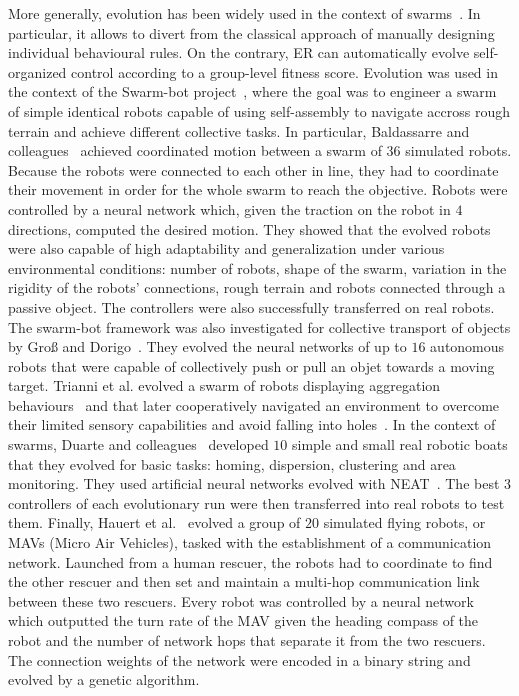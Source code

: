     More generally, evolution has been widely used in the context of swarms~\parencite{Brambilla2012, Francesca2016}. In particular, it allows to divert from the classical approach of manually designing individual behavioural rules. On the contrary, ER can automatically evolve self-organized control according to a group-level fitness score. Evolution was used in the context of the Swarm-bot project~\parencite{Mondada2005}, where the goal was to engineer a swarm of simple identical robots capable of using self-assembly to navigate accross rough terrain and achieve different collective tasks. In particular, Baldassarre and colleagues~\parencite{Baldassarre2003b, Baldassarre2007} achieved coordinated motion between a swarm of $36$ simulated robots. Because the robots were connected to each other in line, they had to coordinate their movement in order for the whole swarm to reach the objective. Robots were controlled by a neural network which, given the traction on the robot in $4$ directions, computed the desired motion. They showed that the evolved robots were also capable of high adaptability and generalization under various environmental conditions: number of robots, shape of the swarm, variation in the rigidity of the robots' connections, rough terrain and robots connected through a passive object. The controllers were also successfully transferred on real robots. The swarm-bot framework was also investigated for collective transport of objects by Groß and Dorigo~\parencite{Gross2004a}. They evolved the neural networks of up to $16$ autonomous robots that were capable of collectively push or pull an objet towards a moving target. Trianni et al. evolved a swarm of robots displaying aggregation behaviours~\parencite{Trianni2003} and that later cooperatively navigated an environment to overcome their limited sensory capabilities and avoid falling into holes~\parencite{Trianni2004}. In the context of swarms, Duarte and colleagues~\parencite{Duarte2016} developed $10$ simple and small real robotic boats that they evolved for basic tasks: homing, dispersion, clustering and area monitoring. They used artificial neural networks evolved with NEAT~\parencite{Stanley2002}. The best $3$ controllers of each evolutionary run were then transferred into real robots to test them. Finally, Hauert et al.~\parencite{Hauert2009} evolved a group of $20$ simulated flying robots, or MAVs (Micro Air Vehicles), tasked with the establishment of a communication network. Launched from a human rescuer, the robots had to coordinate to find the other rescuer and then set and maintain a multi-hop communication link between these two rescuers. Every robot was controlled by a neural network which outputted the turn rate of the MAV given the heading compass of the robot and the number of network hops that separate it from the two rescuers. The connection weights of the network were encoded in a binary string and evolved by a genetic algorithm.

